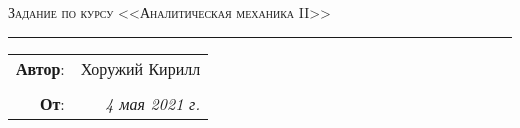 
\begin{center}
    \LARGE \textsc{Задание по курсу <<Аналитическая механика II>>
    }
\end{center}

\hrule

\phantom{42}

\begin{flushright}
    \begin{tabular}{rr}
        \textbf{Автор}: 
        & Хоружий Кирилл \\
        &\\
        \textbf{От}: &
        \textit{4 мая 2021 г.}
        \\
    \end{tabular}
\end{flushright}

\thispagestyle{empty}
\tableofcontents
\newpage